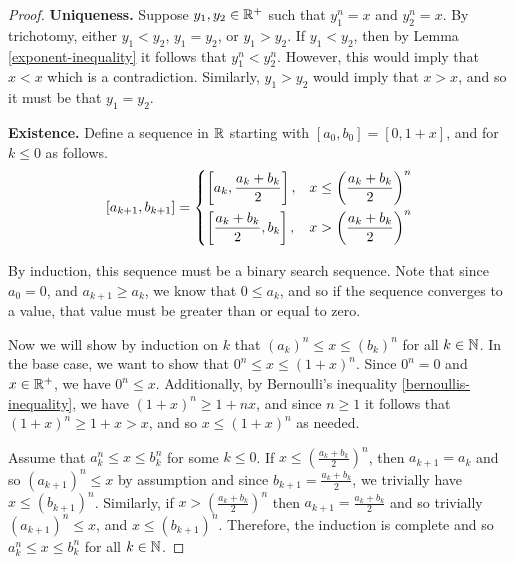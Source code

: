 \begin{proof}\proofbreak
\textbf{Uniqueness.} Suppose $y_1, y_2 \in \mathbb{R}^+$ such that $y_1^n = x$ and $y_2^n = x$. By trichotomy, either $y_1 < y_2$, $y_1 = y_2$, or $y_1 > y_2$. If $y_1 < y_2$, then by Lemma \ref{exponent-inequality} it follows that $y_1^n < y_2^n$. However, this would imply that $x < x$ which is a contradiction. Similarly, $y_1 > y_2$ would imply that $x > x$, and so it must be that $y_1 = y_2$.

\textbf{Existence.} Define a sequence in $\mathbb{R}$ starting with $[a_0, b_0] = [0, 1 + x]$, and for $k \leq 0$ as follows.
\[
    [a_{k+1}, b_{k+1}] =
    \begin{dcases}
        \left[a_k, \frac{a_k+b_k}{2}\right], & x \leq \left(\frac{a_k+b_k}{2}\right)^n \\
        \left[\frac{a_k+b_k}{2}, b_k\right], & x > \left(\frac{a_k+b_k}{2}\right)^n
    \end{dcases}
\]

By induction, this sequence must be a binary search sequence. Note that since $a_0 = 0$, and $a_{k+1} \geq a_k$, we know that $0 \leq a_k$, and so if the sequence converges to a value, that value must be greater than or equal to zero.

Now we will show by induction on $k$ that $(a_k)^n \leq x \leq (b_k)^n$ for all $k \in \mathbb{N}$. In the base case, we want to show that $0^n \leq x \leq (1+x)^n$. Since $0^n = 0$ and $x \in \mathbb{R}^+$, we have $0^n \leq x$. Additionally, by Bernoulli's inequality \ref{bernoullis-inequality}, we have $(1+x)^n \geq 1 + nx$, and since $n \geq 1$ it follows that $(1 + x)^n \geq 1 + x > x$, and so $x \leq (1+x)^n$ as needed.

Assume that $a_k^n \leq x \leq b_k^n$ for some $k \leq 0$. If $x \leq \left(\frac{a_k+b_k}{2}\right)^n$, then $a_{k+1} = a_k$ and so $(a_{k+1})^n \leq x$ by assumption and since $b_{k+1} = \frac{a_k+b_k}{2}$, we trivially have $x \leq (b_{k+1})^n$. Similarly, if $x > \left(\frac{a_k+b_k}{2}\right)^n$ then $a_{k+1} = \frac{a_k+b_k}{2}$ and so trivially $(a_{k+1})^n \leq x$, and $x \leq (b_{k+1})^n$. Therefore, the induction is complete and so $a_k^n \leq x \leq b_k^n$ for all $k \in \mathbb{N}$.


\end{proof}
